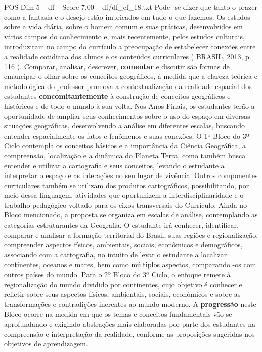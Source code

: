 \begin{textsample}{POS Dim 5 – df – Score 7.00 – df/df\_ef\_18.txt}
Pode -se dizer que tanto o prazer como a fantasia e o desejo estão imbricados em tudo o que fazemos.
Os estudos sobre a vida diária, sobre o homem comum e suas práticas, desenvolvidos em vários campos do conhecimento e, mais recentemente, pelos estudos culturais, introduziram no campo do currículo a preocupação de estabelecer conexões entre a realidade cotidiana dos alunos e os conteúdos curriculares ( BRASIL, 2013, p. 116 ).
Comparar, analisar, descrever, \textbf{comentar} e discutir são formas de emancipar o olhar sobre os conceitos geográficos, à medida que a clareza teórica e metodológica do professor promova a contextualização da realidade espacial dos estudantes \textbf{concomitantemente} à construção de conceitos geográficos e históricos e de todo o mundo à sua volta.
Nos Anos Finais, os estudantes terão a oportunidade de ampliar seus conhecimentos sobre o uso do espaço em diversas situações geográficas, desenvolvendo a análise em diferentes escalas, buscando entender espacialmente os fatos e fenômenos e suas conexões.
O 1º Bloco do 3º Ciclo contempla os conceitos básicos e a importância da Ciência Geográfica, a compreensão, localização e a dinâmica do Planeta Terra, como também busca entender e utilizar a cartografia e seus conceitos, levando o estudante a interpretar o espaço e as interações no seu lugar de vivência.
Outros componentes curriculares também se utilizam dos produtos cartográficos, possibilitando, por meio dessa linguagem, atividades que oportunizem a interdisciplinaridade e o trabalho pedagógico voltado para os eixos transversais do Currículo.
Ainda no Bloco mencionado, a proposta se organiza em escalas de análise, contemplando as categorias estruturantes da Geografia.
O estudante irá conhecer, identificar, comparar e analisar a formação territorial do Brasil, suas regiões e regionalização, compreender aspectos físicos, ambientais, sociais, econômicos e demográficos, associando com a cartografia, no intuito de levar o estudante a localizar continentes, oceanos e mares, bem como múltiplos aspectos, comparando -os com outros países do mundo.
Para o 2º Bloco do 3º Ciclo, o enfoque remete à regionalização do mundo dividido por continentes, cujo objetivo é conhecer e refletir sobre seus aspectos físicos, ambientais, sociais, econômicos e sobre as transformações e contradições inerentes ao mundo moderno.
A \textbf{progressão} neste Bloco ocorre na medida em que os temas e conceitos fundamentais vão se aprofundando e exigindo abstrações mais elaboradas por parte dos estudantes na compreensão e interpretação da realidade, conforme as proposições sugeridas nos objetivos de aprendizagem.

\end{textsample}
